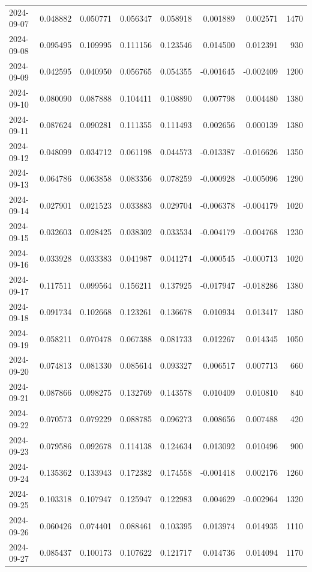 \begin{tabular}{lrrrrrrr}
2024-09-07 & 0.048882 & 0.050771 & 0.056347 & 0.058918 & 0.001889 & 0.002571 & 1470 \\
2024-09-08 & 0.095495 & 0.109995 & 0.111156 & 0.123546 & 0.014500 & 0.012391 & 930 \\
2024-09-09 & 0.042595 & 0.040950 & 0.056765 & 0.054355 & -0.001645 & -0.002409 & 1200 \\
2024-09-10 & 0.080090 & 0.087888 & 0.104411 & 0.108890 & 0.007798 & 0.004480 & 1380 \\
2024-09-11 & 0.087624 & 0.090281 & 0.111355 & 0.111493 & 0.002656 & 0.000139 & 1380 \\
2024-09-12 & 0.048099 & 0.034712 & 0.061198 & 0.044573 & -0.013387 & -0.016626 & 1350 \\
2024-09-13 & 0.064786 & 0.063858 & 0.083356 & 0.078259 & -0.000928 & -0.005096 & 1290 \\
2024-09-14 & 0.027901 & 0.021523 & 0.033883 & 0.029704 & -0.006378 & -0.004179 & 1020 \\
2024-09-15 & 0.032603 & 0.028425 & 0.038302 & 0.033534 & -0.004179 & -0.004768 & 1230 \\
2024-09-16 & 0.033928 & 0.033383 & 0.041987 & 0.041274 & -0.000545 & -0.000713 & 1020 \\
2024-09-17 & 0.117511 & 0.099564 & 0.156211 & 0.137925 & -0.017947 & -0.018286 & 1380 \\
2024-09-18 & 0.091734 & 0.102668 & 0.123261 & 0.136678 & 0.010934 & 0.013417 & 1380 \\
2024-09-19 & 0.058211 & 0.070478 & 0.067388 & 0.081733 & 0.012267 & 0.014345 & 1050 \\
2024-09-20 & 0.074813 & 0.081330 & 0.085614 & 0.093327 & 0.006517 & 0.007713 & 660 \\
2024-09-21 & 0.087866 & 0.098275 & 0.132769 & 0.143578 & 0.010409 & 0.010810 & 840 \\
2024-09-22 & 0.070573 & 0.079229 & 0.088785 & 0.096273 & 0.008656 & 0.007488 & 420 \\
2024-09-23 & 0.079586 & 0.092678 & 0.114138 & 0.124634 & 0.013092 & 0.010496 & 900 \\
2024-09-24 & 0.135362 & 0.133943 & 0.172382 & 0.174558 & -0.001418 & 0.002176 & 1260 \\
2024-09-25 & 0.103318 & 0.107947 & 0.125947 & 0.122983 & 0.004629 & -0.002964 & 1320 \\
2024-09-26 & 0.060426 & 0.074401 & 0.088461 & 0.103395 & 0.013974 & 0.014935 & 1110 \\
2024-09-27 & 0.085437 & 0.100173 & 0.107622 & 0.121717 & 0.014736 & 0.014094 & 1170 \\

\end{tabular}
